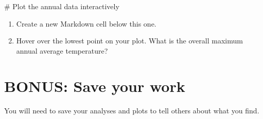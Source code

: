 \documentclass[
  letterpaper,
  DIV=11,
  numbers=noendperiod,
  oneside]{scrreprt}
\newenvironment{Shaded}{\begin{snugshade}}{\end{snugshade}}
\newcommand{\CommentTok}[1]{\textcolor[rgb]{0.37,0.37,0.37}{#1}}
\providecommand{\tightlist}{%
  \setlength{\itemsep}{0pt}\setlength{\parskip}{0pt}}
\begin{document}
\begin{Shaded}
\begin{Highlighting}[]
\CommentTok{\# Plot the annual data interactively}
\end{Highlighting}
\end{Shaded}

\begin{tcolorbox}[enhanced jigsaw, colbacktitle=quarto-callout-color!10!white, opacityback=0, bottomtitle=1mm, toptitle=1mm, bottomrule=.15mm, left=2mm, colframe=quarto-callout-color-frame, leftrule=.75mm, opacitybacktitle=0.6, colback=white, rightrule=.15mm, toprule=.15mm, breakable, titlerule=0mm, title=\textcolor{quarto-callout-color}{\faInfo}\hspace{0.5em}{Try It: Explore the data}, coltitle=black, arc=.35mm]

\begin{enumerate}
\def\labelenumi{\arabic{enumi}.}
\tightlist
\item
  Create a new Markdown cell below this one.
\item
  Hover over the lowest point on your plot. What is the overall maximum
  annual average temperature?
\end{enumerate}

\end{tcolorbox}

\section{BONUS: Save your work}\label{bonus-save-your-work}

You will need to save your analyses and plots to tell others about what
you find.
\end{document}
